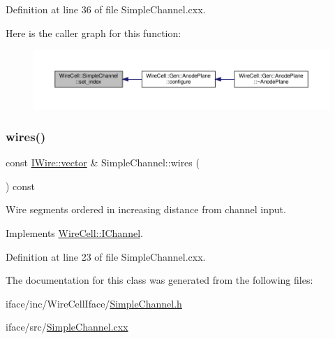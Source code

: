 Definition at line 36 of file Simple\+Channel.\+cxx.

Here is the caller graph for this function\+:
\nopagebreak
\begin{figure}[H]
\begin{center}
\leavevmode
\includegraphics[width=350pt]{class_wire_cell_1_1_simple_channel_af41051f35a8568c3da51dd28821c3330_icgraph}
\end{center}
\end{figure}
\mbox{\label{class_wire_cell_1_1_simple_channel_a4e3b8a6e1f4d2ac98b532bb79aaaa6ef}} 
\subsubsection{\texorpdfstring{wires()}{wires()}}
{\footnotesize\ttfamily const \hyperlink{class_wire_cell_1_1_i_data_ae1a9f863380499bb43f39fabb6276660}{I\+Wire\+::vector} \& Simple\+Channel\+::wires (\begin{DoxyParamCaption}{ }\end{DoxyParamCaption}) const\hspace{0.3cm}{\ttfamily [virtual]}}



Wire segments ordered in increasing distance from channel input. 



Implements \hyperlink{class_wire_cell_1_1_i_channel_a699d41be0c4e79f99dfef3b69394cf52}{Wire\+Cell\+::\+I\+Channel}.



Definition at line 23 of file Simple\+Channel.\+cxx.



The documentation for this class was generated from the following files\+:\begin{DoxyCompactItemize}
\item 
iface/inc/\+Wire\+Cell\+Iface/\hyperlink{_simple_channel_8h}{Simple\+Channel.\+h}\item 
iface/src/\hyperlink{_simple_channel_8cxx}{Simple\+Channel.\+cxx}\end{DoxyCompactItemize}
